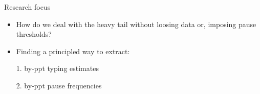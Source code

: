 
\begin{frame}{Research focus}

\begin{small}
\begin{itemize}
	\item How do we deal with the heavy tail without loosing data or, imposing pause thresholds?	
	\item Finding a principled way to extract:
	\item[1.] by-ppt typing estimates
	\item[2.] by-ppt pause frequencies
	

\end{itemize}
\end{small}

\end{frame}